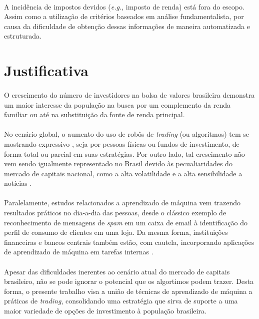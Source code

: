 \paragraph{} A incidência de impostos devidos (\textit{e.g.}, imposto de renda) está fora do escopo. Assim como a utilização de critérios baseados em análise fundamentalista, por causa da dificuldade de obtenção dessas informações de maneira automatizada e estruturada.



\FloatBarrier
\section{Justificativa}

\paragraph{} O crescimento do número de investidores na bolsa de valores brasileira \cite{aumento_investidores} demonstra um maior interesse da população na busca por um complemento da renda familiar ou até na substituição da fonte de renda principal.

\paragraph{} No cenário global, o aumento do uso de robôs de \textit{trading} (ou algoritmos) tem se mostrando expressivo \cite{robos_investidores}, seja por pessoas físicas ou fundos de investimento, de forma total ou parcial em suas estratégias. Por outro lado, tal crescimento não vem sendo igualmente representado no Brasil devido às pecualiaridades do mercado de capitais nacional, como a alta volatilidade e a alta sensibilidade a notícias \cite{robos_e_fundos}.

\paragraph{} Paralelamente, estudos relacionados a aprendizado de máquina vem trazendo resultados práticos no dia-a-dia das pessoas, desde o clássico exemplo de reconhecimento de mensagens de \textit{spam} em um caixa de email à identificação do perfil de consumo de clientes em uma loja. Da mesma forma, instituições financeiras e bancos centrais também estão, com cautela, incorporando aplicações de aprendizado de máquina em tarefas internas \cite{fernandez2019artificial}.

\paragraph{} Apesar das dificuldades inerentes ao cenário atual do mercado de capitais brasileiro, não se pode ignorar o potencial que os algortimos podem trazer. Desta forma, o presente trabalho visa a união de técnicas de aprendizado de máquina a práticas de \textit{trading}, consolidando uma estratégia que sirva de suporte a uma maior variedade de opções de investimento à população brasileira.



